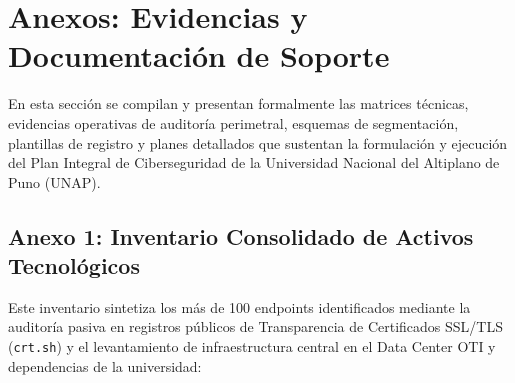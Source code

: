\chapter*{Anexos: Evidencias y Documentación de Soporte}

En esta sección se compilan y presentan formalmente las matrices técnicas, evidencias operativas de auditoría perimetral, esquemas de segmentación, plantillas de registro y planes detallados que sustentan la formulación y ejecución del Plan Integral de Ciberseguridad de la Universidad Nacional del Altiplano de Puno (UNAP).

\section*{Anexo 1: Inventario Consolidado de Activos Tecnológicos}

Este inventario sintetiza los más de 100 endpoints identificados mediante la auditoría pasiva en registros públicos de Transparencia de Certificados SSL/TLS (\texttt{crt.sh}) y el levantamiento de infraestructura central en el Data Center OTI y dependencias de la universidad:

